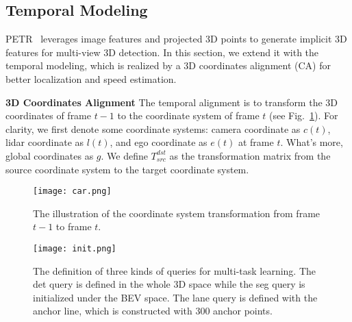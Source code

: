 \documentclass[10pt,twocolumn,letterpaper]{article}
\begin{document}
\subsection{Temporal Modeling}



PETR~\cite{liu2022petr} leverages image features and projected 3D points to generate implicit 3D features for multi-view 3D detection. In this section, we extend it with the temporal modeling, which is realized by a 3D coordinates alignment (CA) for better localization and speed estimation. 

\noindent \textbf{3D Coordinates Alignment} 
The temporal alignment is to transform the 3D coordinates of frame $t-1$ to the coordinate system of frame $t$ (see Fig.~\ref{coordinate}). For clarity, we first denote some coordinate systems: camera coordinate as $c(t)$, lidar coordinate as  $l(t)$, and ego coordinate as $e(t)$ at frame $t$. What's more, global coordinates as $g$.
We define $T^{dst}_{src}$ as the transformation matrix from the source coordinate system to the target coordinate system.

\begin{figure}[h]
	\centering  
	\texttt{[image: car.png]}
	\caption{The illustration of the coordinate system transformation from frame $t-1$ to frame $t$.
    }  
	\label{coordinate}
\end{figure}

\begin{figure*}[t]
	\centering  
	\texttt{[image: init.png]}
    \vspace{-10pt}
	\caption{
	 The definition of three kinds of queries for multi-task learning. The det query is defined in the whole 3D space while the seg query is initialized under the BEV space. The lane query is defined with the anchor line, which is constructed with 300 anchor points.  
    }  
	\label{seg}
\end{figure*}
\end{document}
